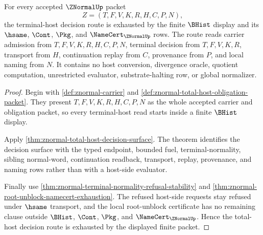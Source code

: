 \begin{theorem}
\label{thm:znormal-total-host-decision-route-exhaustion}
For every accepted $\ZNormalUp$ packet
$$
Z=(T,F,V,K,R,H,C,P,N),
$$
the terminal-host decision route is exhausted by the finite $\BHist$ display and its $\hsame$, $\Cont$, $\Pkg$, and $\NameCert_{\ZNormalUp}$ rows. The route reads carrier admission from $T,F,V,K,R,H,C,P,N$, terminal decision from $T,F,V,K,R$, transport from $H$, continuation replay from $C$, provenance from $P$, and local naming from $N$. It contains no host conversion, divergence oracle, quotient computation, unrestricted evaluator, substrate-halting row, or global normalizer.
\end{theorem}
\begin{proof}
Begin with \autoref{def:znormal-carrier} and \autoref{def:znormal-total-host-obligation-packet}. They present $T,F,V,K,R,H,C,P,N$ as the whole accepted carrier and obligation packet, so every terminal-host read starts inside a finite $\BHist$ display.

Apply \autoref{thm:znormal-total-host-decision-surface}. The theorem identifies the decision surface with the typed endpoint, bounded fuel, terminal-normality, sibling normal-word, continuation readback, transport, replay, provenance, and naming rows rather than with a host-side evaluator.

Finally use \autoref{thm:znormal-terminal-normality-refusal-stability} and \autoref{thm:znormal-root-unblock-namecert-exhaustion}. The refused host-side requests stay refused under $\hsame$ transport, and the local root-unblock certificate has no remaining clause outside $\BHist$, $\Cont$, $\Pkg$, and $\NameCert_{\ZNormalUp}$. Hence the total-host decision route is exhausted by the displayed finite packet.
\end{proof}

